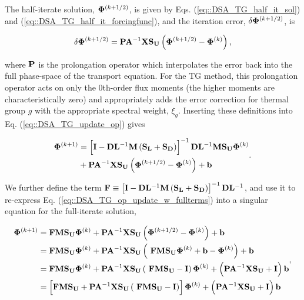 \noindent The half-iterate solution, ${\bf \Phi}^{(k+1/2)}$, is given by Eqs. (\ref{eq::DSA_TG_half_it_sol}) and (\ref{eq::DSA_TG_half_it_forcingfunc}), and the iteration error, $\delta {\bf \Phi}^{(k+1/2)}$, is 

\begin{equation}
\label{eq::DSA_TG_proj_err}
\delta {\bf \Phi}^{(k+1/2)} =  {\bf P} {\bf A}^{-1}  {\bf X} {\bf S_{U}} \left(  {\bf \Phi}^{(k+1/2)} - {\bf \Phi}^{(k)}  \right),
\end{equation}

\noindent where ${\bf P}$ is the prolongation operator which interpolates the error back into the full phase-space of the transport equation. For the TG method, this prolongation operator acts on only the 0th-order flux moments (the higher moments are characteristically zero) and appropriately adds the error correction for thermal group $g$ with the appropriate spectral weight, $\xi_g$. Inserting these definitions into Eq. (\ref{eq::DSA_TG_update_op}) gives

\begin{equation}
\label{eq::DSA_TG_op_update_w_fullterms}
\begin{aligned}
 {\bf \Phi}^{(k+1)} &=  \left[ {\bf I} - {\bf D}{\bf L}^{-1} {\bf M} \left(  {\bf S_L} + {\bf S_D} \right) \right]^{-1} {\bf D}{\bf L}^{-1}  {\bf M} {\bf S_U} {\bf \Phi}^{(k)} \\
  &+  {\bf P} {\bf A}^{-1}  {\bf X} {\bf S_{U}} \left(  {\bf \Phi}^{(k+1/2)} - {\bf \Phi}^{(k)}  \right) + {\bf b}
\end{aligned} .
\end{equation}

\noindent We further define the term ${\bf F} \equiv \left[ {\bf I} - {\bf D}{\bf L}^{-1} {\bf M} \left(  {\bf S_L} + {\bf S_D} \right) \right]^{-1} {\bf D}{\bf L}^{-1}$, and use it to re-express Eq. (\ref{eq::DSA_TG_op_update_w_fullterms}) into a singular equation for the full-iterate solution,

\begin{equation}
\label{eq::DSA_TG_op_update_simple}
\begin{aligned}
 {\bf \Phi}^{(k+1)} &=  {\bf F}  {\bf M} {\bf S_U} {\bf \Phi}^{(k)} +  {\bf P} {\bf A}^{-1}  {\bf X} {\bf S_{U}} \left(  {\bf \Phi}^{(k+1/2)} - {\bf \Phi}^{(k)}  \right) + {\bf b} \\
&= {\bf F}  {\bf M} {\bf S_U} {\bf \Phi}^{(k)} +  {\bf P} {\bf A}^{-1}  {\bf X} {\bf S_{U}} \left(  \ {\bf F}  {\bf M} {\bf S_U} {\bf \Phi}^{(k)} + {\bf b} - {\bf \Phi}^{(k)}  \right) + {\bf b} \\
&= {\bf F}  {\bf M} {\bf S_U} {\bf \Phi}^{(k)} +  {\bf P} {\bf A}^{-1}  {\bf X} {\bf S_{U}} \left(  \ {\bf F}  {\bf M} {\bf S_U}  -  {\bf I} \right){\bf \Phi}^{(k)} + \left(  {\bf P} {\bf A}^{-1}  {\bf X} {\bf S_{U}}  + {\bf I} \right) {\bf b} \\
&= \left[ {\bf F}  {\bf M} {\bf S_U} +  {\bf P} {\bf A}^{-1}  {\bf X} {\bf S_{U}} \left(  \ {\bf F}  {\bf M} {\bf S_U}  -  {\bf I} \right) \right] {\bf \Phi}^{(k)} + \left(  {\bf P} {\bf A}^{-1}  {\bf X} {\bf S_{U}}  + {\bf I} \right) {\bf b}
\end{aligned} ,
\end{equation}

